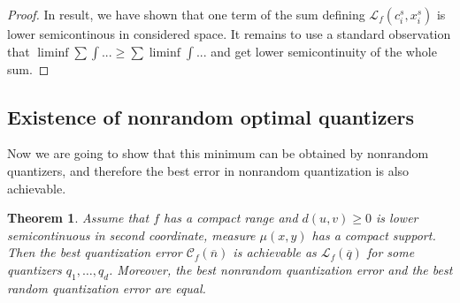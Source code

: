\documentclass{amsart}
\newtheorem{theorem}{Theorem}[section]
\theoremstyle{remark}
\numberwithin{equation}{section}
\numberwithin{figure}{section}
\def\v{\overline}
\begin{document}
\begin{proof}
In result, we have shown that one term of the sum defining $\mathcal{L}_f(c_i^s, x_i^s)$ is lower semicontinous in considered space. It remains to use a standard observation that $\liminf \sum \int ... \geq \sum \liminf \int ...$ and get lower semicontinuity of the whole sum.
	\end{proof}
	
	
	\subsection{Existence of nonrandom optimal quantizers}
	Now we are going to show that this minimum can be obtained by nonrandom quantizers, and therefore the best error in nonrandom quantization is also achievable.
	
	\begin{theorem}
		\label{thm:exist}
		Assume that $f$ has a compact range and $d(u, v) \geq 0$ is lower semicontinuous in second coordinate, measure $\mu(x, y)$ has a compact support. Then the best quantization error $\mathcal{C}_f(\v n)$ is achievable as $\mathcal{L}_f(\v q)$ for some quantizers $q_1, \ldots, q_d$. Moreover, the best nonrandom quantization error and the best random quantization error are equal.
	\end{theorem}	
	
\end{document}
